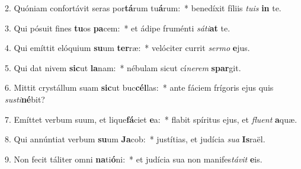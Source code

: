 2. Quóniam confortávit seras por\textbf{tá}rum tu\textbf{á}rum:~*  benedíxit fíliis \textit{tu}\textit{is} \textbf{in} te.\

3. Qui pósuit fines \textbf{tu}os \textbf{pa}cem:~*  et ádipe fruménti \textit{sá}\textit{ti}\textbf{at} te.\

4. Qui emíttit elóquium \textbf{su}um \textbf{ter}ræ:~*  velóciter currit \textit{ser}\textit{mo} \textbf{e}jus.\

5. Qui dat nivem \textbf{sic}ut \textbf{la}nam:~*  nébulam sicut cí\textit{ne}\textit{rem} \textbf{spar}git.\

6. Mittit crystállum suam \textbf{sic}ut buc\textbf{cél}las:~*  ante fáciem frígoris ejus quis \textit{sus}\textit{ti}\textbf{né}bit?\

7. Emíttet verbum suum, et lique\textbf{fá}ciet \textbf{e}a:~*  flabit spíritus ejus, et \textit{flu}\textit{ent} \textbf{a}quæ.\

8. Qui annúntiat verbum \textbf{su}um \textbf{Ja}cob:~*  justítias, et judícia \textit{su}\textit{a} \textbf{Is}raël.\

9. Non fecit táliter omni \textbf{na}ti\textbf{ó}ni:~*  et judícia sua non manifes\textit{tá}\textit{vit} \textbf{e}is.\


